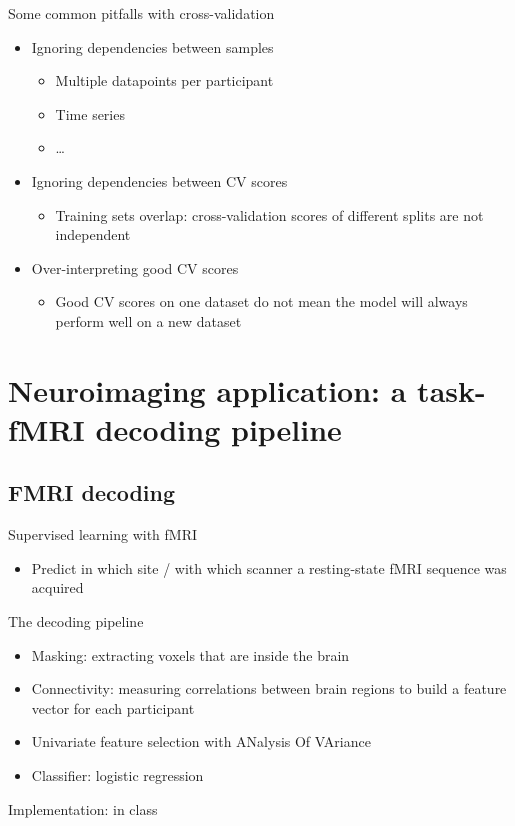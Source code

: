 \documentclass[presentation,mathserif,table]{beamer}
\begin{document}
\begin{frame}[label={sec:orge1628f4}]{Some common pitfalls with cross-validation}
\begin{itemize}
\item Ignoring dependencies between samples
\begin{itemize}
\item Multiple datapoints per participant
\item Time series
\item \ldots{}
\end{itemize}
\item Ignoring dependencies between CV scores
\begin{itemize}
\item Training sets overlap: cross-validation scores of different splits are not independent
\end{itemize}
\item Over-interpreting good CV scores
\begin{itemize}
\item Good CV scores on one dataset do not mean the model will always perform well on a new dataset
\end{itemize}
\end{itemize}
\end{frame}

\section{Neuroimaging application: a task-fMRI decoding pipeline}
\label{sec:orgac4c6ab}
\subsection{FMRI decoding}
\label{sec:org6c57488}
\begin{frame}[label={sec:orgd39a506}]{Supervised learning with fMRI}
\begin{itemize}
\item Predict in which site / with which scanner a resting-state fMRI sequence was acquired
\end{itemize}
\end{frame}
\begin{frame}[label={sec:org08fbc6a}]{The decoding pipeline}
\begin{itemize}
\item Masking: extracting voxels that are inside the brain
\item Connectivity: measuring correlations between brain regions to build a feature vector for each participant
\item Univariate feature selection with ANalysis Of VAriance
\item Classifier: logistic regression
\end{itemize}
\end{frame}
\begin{frame}[label={sec:orgc6df758}]{Implementation: in class}
\end{frame}
\end{document}

